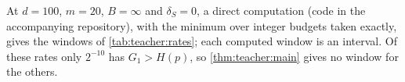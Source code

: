 At $d=100$, $m=20$, $B=\infty$ and $\delta_S=0$, a direct computation (code in the accompanying repository), with the minimum over integer budgets taken exactly, gives the windows of \cref{tab:teacher:rates}; each computed window is an interval. Of these rates only $2^{-10}$ has $G_1>H(p)$, so \cref{thm:teacher:main} gives no window for the others.
